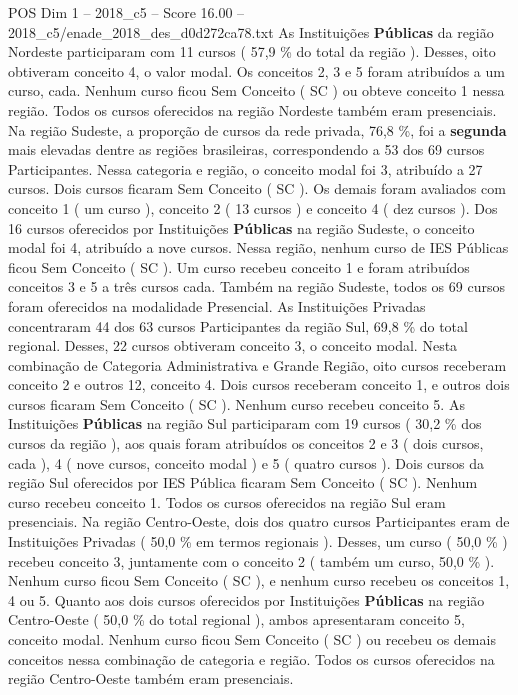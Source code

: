 \begin{textsample}{POS Dim 1 – 2018\_c5 – Score 16.00 – 2018\_c5/enade\_2018\_des\_d0d272ca78.txt}
As Instituições \textbf{Públicas} da região Nordeste participaram com 11 cursos ( 57,9 \% do total da região ).
Desses, oito obtiveram conceito 4, o valor modal.
Os conceitos 2, 3 e 5 foram atribuídos a um curso, cada.
Nenhum curso ficou Sem Conceito ( SC ) ou obteve conceito 1 nessa região.
Todos os cursos oferecidos na região Nordeste também eram presenciais.
Na região Sudeste, a proporção de cursos da rede privada, 76,8 \%, foi a \textbf{segunda} mais elevadas dentre as regiões brasileiras, correspondendo a 53 dos 69 cursos Participantes.
Nessa categoria e região, o conceito modal foi 3, atribuído a 27 cursos.
Dois cursos ficaram Sem Conceito ( SC ).
Os demais foram avaliados com conceito 1 ( um curso ), conceito 2 ( 13 cursos ) e conceito 4 ( dez cursos ).
Dos 16 cursos oferecidos por Instituições \textbf{Públicas} na região Sudeste, o conceito modal foi 4, atribuído a nove cursos.
Nessa região, nenhum curso de IES Públicas ficou Sem Conceito ( SC ).
Um curso recebeu conceito 1 e foram atribuídos conceitos 3 e 5 a três cursos cada.
Também na região Sudeste, todos os 69 cursos foram oferecidos na modalidade Presencial.
As Instituições Privadas concentraram 44 dos 63 cursos Participantes da região Sul, 69,8 \% do total regional.
Desses, 22 cursos obtiveram conceito 3, o conceito modal.
Nesta combinação de Categoria Administrativa e Grande Região, oito cursos receberam conceito 2 e outros 12, conceito 4.
Dois cursos receberam conceito 1, e outros dois cursos ficaram Sem Conceito ( SC ).
Nenhum curso recebeu conceito 5.
As Instituições \textbf{Públicas} na região Sul participaram com 19 cursos ( 30,2 \% dos cursos da região ), aos quais foram atribuídos os conceitos 2 e 3 ( dois cursos, cada ), 4 ( nove cursos, conceito modal ) e 5 ( quatro cursos ).
Dois cursos da região Sul oferecidos por IES Pública ficaram Sem Conceito ( SC ).
Nenhum curso recebeu conceito 1.
Todos os cursos oferecidos na região Sul eram presenciais.
Na região Centro-Oeste, dois dos quatro cursos Participantes eram de Instituições Privadas ( 50,0 \% em termos regionais ).
Desses, um curso ( 50,0 \% ) recebeu conceito 3, juntamente com o conceito 2 ( também um curso, 50,0 \% ).
Nenhum curso ficou Sem Conceito ( SC ), e nenhum curso recebeu os conceitos 1, 4 ou 5.
Quanto aos dois cursos oferecidos por Instituições \textbf{Públicas} na região Centro-Oeste ( 50,0 \% do total regional ), ambos apresentaram conceito 5, conceito modal.
Nenhum curso ficou Sem Conceito ( SC ) ou recebeu os demais conceitos nessa combinação de categoria e região.
Todos os cursos oferecidos na região Centro-Oeste também eram presenciais.

\end{textsample}
